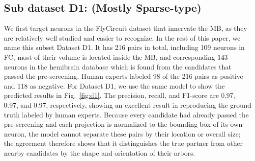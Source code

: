 \documentclass[10pt,a4paper]{article}
\begin{document}
\subsection{Sub dataset D1: (Mostly Sparse-type)}



We first target neurons in the FlyCircuit dataset that innervate the MB, as they
are relatively well studied and easier to recognize. In the rest of this paper,
we name this subset Dataset D1. It has 216 pairs in total, including 109 neurons
in FC, most of their volume is located inside the MB, and corresponding 143 neurons in the hemibrain database which is found from the
candidates that passed the pre-screening. Human experts labeled 98 of the 216 pairs as positive and 118 as
negative.
For Dataset D1, we use the same model to show the predicted results in
Fig.~\ref{fig:d1}. The precision, recall, and F1-score are 0.97, 0.97, and 0.97,
respectively, showing an excellent result in reproducing the ground truth
labeled by human experts. Because every candidate had already passed the
pre-screening and each projection is normalized to the bounding box of its own
neuron, the model cannot separate these pairs by their location or overall
size; the agreement therefore shows that it distinguishes the true partner from
other nearby candidates by the shape and orientation of their arbors.
\end{document}
